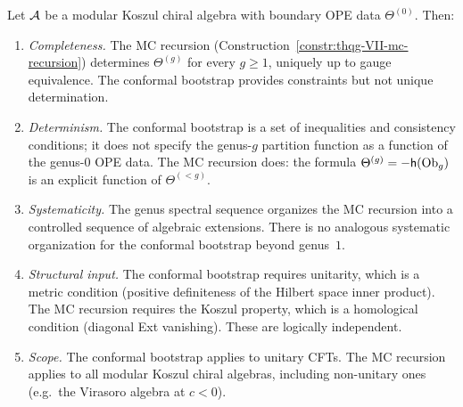 \begin{theorem}
\label{thm:thqg-VII-mc-vs-bootstrap}
Let $\mathcal{A}$ be a modular Koszul chiral algebra with boundary OPE
data $\Theta^{(0)}$. Then:

\begin{enumerate}[label=\textup{(\roman*)}]
\item \emph{Completeness.} The MC recursion
 \textup{(}Construction~\textup{\ref{constr:thqg-VII-mc-recursion})}
 determines $\Theta^{(g)}$ for every $g \geq 1$, uniquely
 up to gauge equivalence. The conformal bootstrap provides
 constraints but not unique determination.

\item \emph{Determinism.} The conformal bootstrap is a
 set of inequalities and consistency conditions; it does not
 specify the genus-$g$ partition function as a function of
 the genus-$0$ OPE data. The MC recursion does: the
 formula $\Theta^{(g)} = -\mathsf{h}(\mathrm{Ob}_g)$ is an explicit
 function of $\Theta^{(<g)}$.

\item \emph{Systematicity.} The genus spectral sequence
 organizes the MC recursion into a controlled sequence of
 algebraic extensions. There is no analogous systematic
 organization for the conformal bootstrap beyond genus~$1$.

\item \emph{Structural input.} The conformal bootstrap
 requires unitarity, which is a metric condition (positive
 definiteness of the Hilbert space inner product). The MC
 recursion requires the Koszul property, which is a homological
 condition (diagonal Ext vanishing). These are logically
 independent.

\item \emph{Scope.} The conformal bootstrap applies to
 unitary CFTs. The MC recursion applies to all modular
 Koszul chiral algebras, including non-unitary ones
 \textup{(}e.g.\ the Virasoro algebra at $c < 0$\textup{)}.
\end{enumerate}
\end{theorem}

